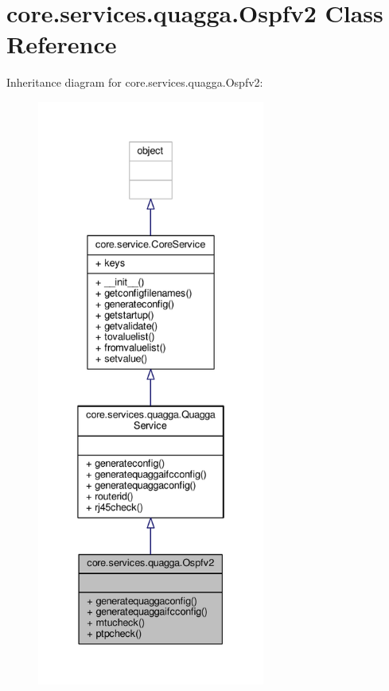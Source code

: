 \hypertarget{classcore_1_1services_1_1quagga_1_1_ospfv2}{\section{core.\+services.\+quagga.\+Ospfv2 Class Reference}
\label{classcore_1_1services_1_1quagga_1_1_ospfv2}
}


Inheritance diagram for core.\+services.\+quagga.\+Ospfv2\+:
\nopagebreak
\begin{figure}[H]
\begin{center}
\leavevmode
\includegraphics[height=550pt]{classcore_1_1services_1_1quagga_1_1_ospfv2__inherit__graph}
\end{center}
\end{figure}


